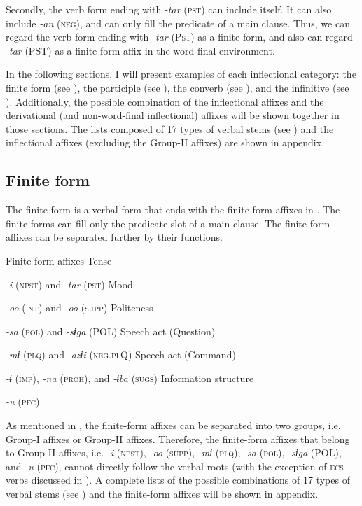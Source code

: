 Secondly, the verb form ending with \textit{{}-tar} (\textsc{pst}) can include itself. It can also include \textit{{}-an} (\textsc{neg}), and can only fill the predicate of a main clause. Thus, we can regard the verb form ending with \textit{{}-tar} (P\textsc{st}) as a finite form, and also can regard \textit{{}-tar} (PST) as a finite-form affix in the word-final environment.

In the following sections, I will present examples of each inflectional category: the finite form (see ), the participle (see ), the converb (see ), and the infinitive (see ). Additionally, the possible combination of the inflectional affixes and the derivational (and non-word-final inflectional) affixes will be shown together in those sections. The lists composed of 17 types of verbal stems (see ) and the inflectional affixes (excluding the Group-II affixes) are shown in appendix.

\subsection{Finite form}

The finite form is a verbal form that ends with the finite-form affixes in . The finite forms can fill only the predicate slot of a main clause. The finite-form affixes can be separated further by their functions.

\ea\label{ex:8-52}
  Finite-form affixes
\ea Tense

    \textit{{}-i} (\textsc{npst}) and \textit{{}-tar} (\textsc{pst})
\ex Mood

    \textit{{}-oo} (\textsc{int}) and \textit{-oo} (\textsc{supp})
\ex Politeness

    \textit{{}-sa} (\textsc{pol}) and \textit{{}-sɨga} (POL)
\ex Speech act (Question)

    \textit{{}-mɨ} (\textsc{plq}) and \textit{{}-azɨi} (\textsc{neg}.\textsc{pl}Q)
\ex Speech act (Command)

    \textit{{}-ɨ} (\textsc{imp}), \textit{{}-na} (\textsc{proh}), and \textit{{}-ɨba} (\textsc{sugs})
\ex Information structure

    \textit{{}-u} (\textsc{pfc})
\z
\z

As mentioned in , the finite-form affixes can be separated into two groups, i.e. Group-I affixes or Group-II affixes. Therefore, the finite-form affixes that belong to Group-II affixes, i.e. \textit{{}-i} (\textsc{npst}), \textit{{}-oo} (\textsc{supp}), \textit{{}-mɨ} (\textsc{plq}), \textit{{}-sa} (\textsc{pol}), \textit{{}-sɨga} (POL), and \textit{{}-u} (\textsc{pfc}), cannot directly follow the verbal roots (with the exception of \textsc{ecs} verbs discussed in ). A complete lists of the possible combinations of 17 types of verbal stems (see ) and the finite-form affixes will be shown in appendix.

